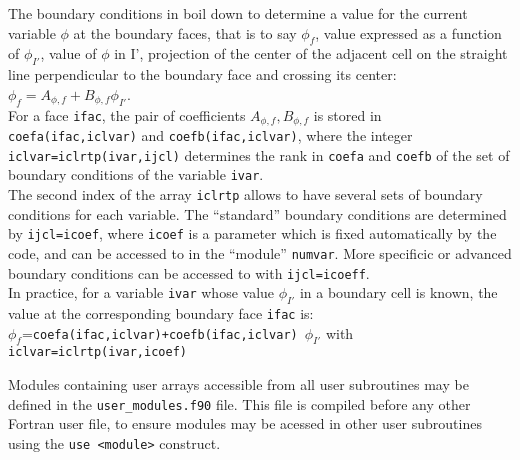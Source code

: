 {{{



The boundary conditions in \CS boil down to determine a value for the
current variable $\phi$ at the boundary faces, that is to say $\phi_f$,
value expressed as a function of $\phi_{I'}$, value of $\phi$ in I',
projection of the center of the adjacent cell on the straight line
perpendicular to the boundary face and crossing its center:
$\phi_f=A_{\phi,f}+B_{\phi,f}\phi_{I'}$.  \\
For a face \texttt{ifac}, the pair of coefficients $A_{\phi,f},B_{\phi,f}$ is
stored in \texttt{coefa(ifac,iclvar)} and
\texttt{coefb(ifac,iclvar)}, where the integer \texttt{iclvar=iclrtp(ivar,ijcl)}
determines the rank in \texttt{coefa} and \texttt{coefb} of the set of boundary
conditions of the variable \texttt{ivar}. \\
The second index of the array \texttt{iclrtp} allows to have several sets of
boundary conditions for each variable. The ``standard'' boundary
conditions are determined by \texttt{ijcl=icoef}, where \texttt{icoef} is a
parameter which is fixed automatically by the code, and can be accessed to in the
``module'' \texttt{numvar}. More specificic or advanced boundary
conditions can be accessed to with \texttt{ijcl=icoeff}. \\
In practice, for a variable \texttt{ivar} whose value $\phi_{I'}$ in a
boundary cell is known, the value at the corresponding boundary face
\texttt{ifac} is: \\
\mbox{$\phi_f$=\texttt{coefa(ifac,iclvar)+coefb(ifac,iclvar)} $\phi_{I'}$}
with \texttt{iclvar=iclrtp(ivar,icoef)}

Modules containing user arrays accessible from all user subroutines may
be defined in the \texttt{user\_modules.f90} file. This file is
compiled before any other Fortran user file, to ensure modules
may be acessed in other user subroutines using the \texttt{use <module>}
construct.

}}}
